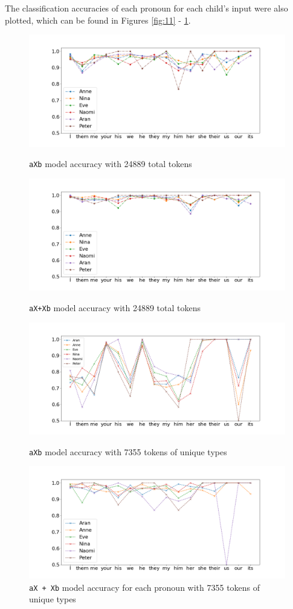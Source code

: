 The classification accuracies of each pronoun for each child's input were also plotted, which can be found in Figures \ref{fig:11} - \ref{fig:14}.
\FloatBarrier
\begin{figure}[!h]
\centering
    \includegraphics[scale = 0.3]{graph/AXbdots.png}
    \caption{\footnotesize{\texttt{aXb} model accuracy with 24889 total tokens}}
    \label{fig:11}
    \includegraphics[scale = 0.3]{graph/AXXbdots.png}
    \caption{\footnotesize\texttt{aX+Xb} model accuracy with 24889 total tokens}
    \includegraphics[scale = 0.3]{graph/AXbdots7355.png}
    \caption{\footnotesize\texttt{aXb} model accuracy with 7355 tokens of unique types}
     \includegraphics[scale = 0.3]{graph/AXXbdots7355.png}
    \caption{\texttt{aX + Xb} model accuracy for each pronoun with 7355 tokens of unique types}
    \label{fig:14}
\end{figure}
\FloatBarrier

